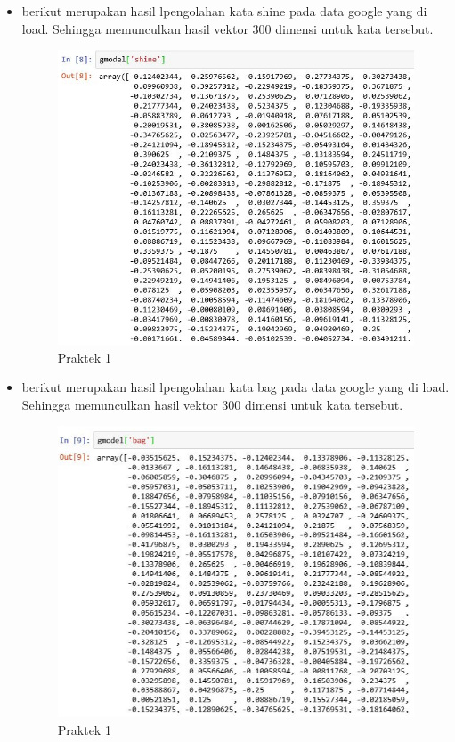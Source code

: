 \begin{enumerate}
\begin{itemize}
\item berikut merupakan hasil lpengolahan kata shine pada data google yang di load. Sehingga memunculkan hasil vektor 300 dimensi untuk kata tersebut. 

\begin{figure}[ht]
\centering
\includegraphics[scale=0.6]{figures/1174008/5/2,1,6.PNG}
\caption{Praktek 1}
\end{figure}

\item berikut merupakan hasil lpengolahan kata bag pada data google yang di load. Sehingga memunculkan hasil vektor 300 dimensi untuk kata tersebut. 

\begin{figure}[ht]
\centering
\includegraphics[scale=0.6]{figures/1174008/5/2,1,7.PNG}
\caption{Praktek 1}
\end{figure}


\end{itemize}
\end{enumerate}
